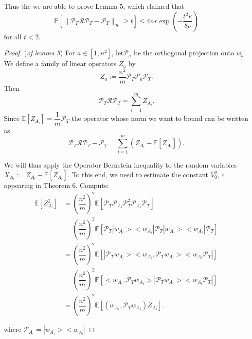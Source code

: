 \documentclass{article}
\begin{document}
Thus the we are able to prove Lemma 5, which claimed that
\[
\mathbb{P}[\|\mathcal{P}_T\mathcal{R}\mathcal{P}_T-\mathcal{P}_T\|_{op}\ge t] \le 4nr \exp\left(-\dfrac{t^2\kappa}{8\nu}\right)
\]
for all $t<2$.

\begin{proof}(\textit{of lemma 5}) For $a\in[1,n^2]$, let$ \mathcal{P}_a$ be the orthogonal projection onto $w_a$. We define a family of linear operators $Z_a$ by
\[
Z_a := \dfrac{n^2}{m}\mathcal{P}_T\mathcal{P}_a\mathcal{P}_T. 
\]
Then
\[
\mathcal{P}_T\mathcal{R}\mathcal{P}_T = \sum_{i=1}^m Z_{A_i}.
\]
Since $\mathbb{E}[Z_{A_i}] = \dfrac{1}{m}\mathcal{P}_T$ the operator whose norm we want to bound can be written as 
\[
\mathcal{P}_T \mathcal{R} \mathcal{P}_T - \mathcal{P}_T = \sum_{i=1}^m(Z_{A_i}-\mathbb{E}[Z_{A_i}]).
\]

We will thus apply the Operator Bernstein inequality to the random variables $X_{A_i} := Z_{A_i}-\mathbb{E}[Z_{A_i}]$. To this end, we need to estimate the constant $V_0^2$, $c$ appearing in Theorem 6.
Compute:
\begin{equation}
\begin{aligned}
\mathbb{E}[Z_{A_i}^2] 
& = (\dfrac{n^2}{m})^2\mathbb{E}[\mathcal{P}_T \mathcal{P}_{A_i} \mathcal{P}_T^2 \mathcal{P}_{A_i} \mathcal{P}_T]\\
& = (\dfrac{n^2}{m})^2\mathbb{E}[\mathcal{P}_T |w_{A_i}><w_{A_i}|\mathcal{P}_T|w_{A_i}><w_{A_i}|\mathcal{P}_T]\\
& = (\dfrac{n^2}{m})^2\mathbb{E}[|\mathcal{P}_T w_{A_i}><w_{A_i},\mathcal{P}_T w_{A_i}><w_{A_i} \mathcal{P}_T|]\\
&= (\dfrac{n^2}{m})^2\mathbb{E}[<w_{A_i},\mathcal{P}_T w_{A_i}>|\mathcal{P}_T w_{A_i}><w_{A_i} \mathcal{P}_T|]\\
& =(\dfrac{n^2}{m})^2\mathbb{E}[(w_{A_i}, \mathcal{P}_Tw_{A_i})Z_{A_i}].
\end{aligned}
\end{equation}

where $\mathcal{P}_{A_i}=|w_{A_i}><w_{A_i}|$


\end{proof}
\end{document}
